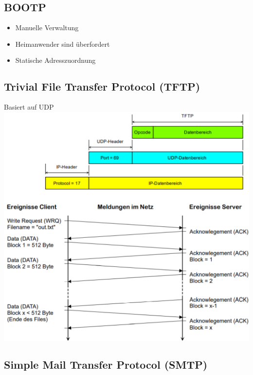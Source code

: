 \subsection{BOOTP}{
    \begin{itemize}[noitemsep]
        \item Manuelle Verwaltung
        \item Heimanwender sind überfordert
        \item Statische Adresszuordnung
    \end{itemize}

}



\subsection{Trivial File Transfer Protocol (TFTP)}
{Basiert auf UDP}
\includegraphics[scale=.5]{img/tftp.png}

\subsection{Simple Mail Transfer Protocol (SMTP)}

